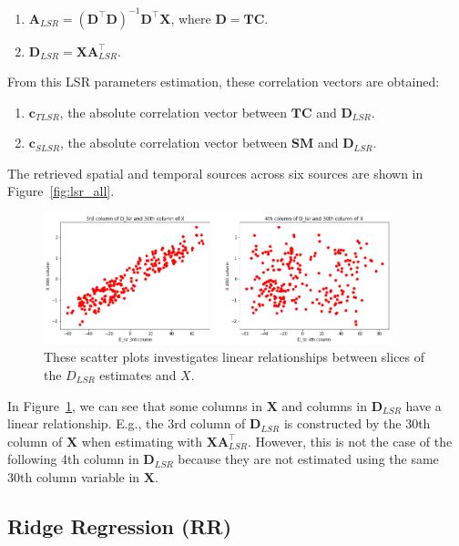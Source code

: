 \documentclass[11pt]{article}
\def\*#1{\mathbf{#1}}
\begin{document}
\begin{enumerate}
    \item $ \*A_{LSR} = (\*D^\top \*D)^{-1} \*D^\top \*X $, where $ \*D = \*{TC}$.
    \item $ \*D_{LSR} = \*X \*A^\top_{LSR}$.
\end{enumerate}

From this LSR parameters estimation, these correlation vectors are obtained:

\begin{enumerate}
    \item $\mathbf{c}_{TLSR}$, the absolute correlation vector between $\*{TC}$ and $\*D_{LSR}$.
    \item $\mathbf{c}_{SLSR}$, the absolute correlation vector between $\*{SM}$ and $\*D_{LSR}$.
\end{enumerate}

The retrieved spatial and temporal sources across six sources are shown in Figure~\ref{fig:lsr_all}.

    \begin{figure}[H]
        \begin{center}
            \includegraphics[width=0.9\textwidth]{../plots/2_1_Dlsr_vs_X_linear}
        \caption{These scatter plots investigates linear relationships between slices of the $D_{LSR}$ estimates and $X$.}
        \label{fig:dlrs_linear}
        \end{center}
    \end{figure}

In Figure~\ref{fig:dlrs_linear}, we can see that some columns in $\*X$ and columns in $\*D_{LSR}$ have a linear relationship. E.g., the 3rd column of $\*D_{LSR}$ is constructed by the 30th column of $\*X$ when estimating with $\*X \*A^\top_{LSR}$. However, this is not the case of the following 4th column in $\*D_{LSR}$ because they are not estimated using the same 30th column variable in $\*X$.

\subsection{Ridge Regression (RR)}
\label{sec:rrestimate}
\end{document}
